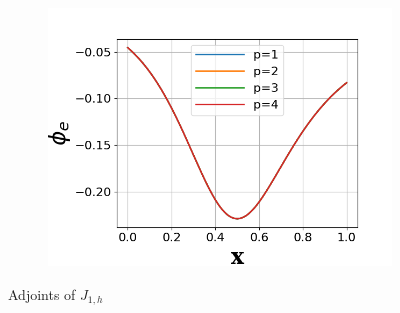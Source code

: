 \documentclass[a4paper]{article}
\begin{document}
\begin{figure}[!htbp]
\begin{subfigure}{0.45\textwidth}
    \label{fig:j1_phi2}
  \end{subfigure}
\begin{subfigure}{0.45\textwidth}
  \centering
  \includegraphics[width=1.0\linewidth]{figures/J1_phi_3.png}
  \label{fig:j1_phi3}
\end{subfigure}
  \caption{Adjoints of $J_{1,h}$} 
  \label{fig:j1_phi}
\end{figure}
\end{document}
